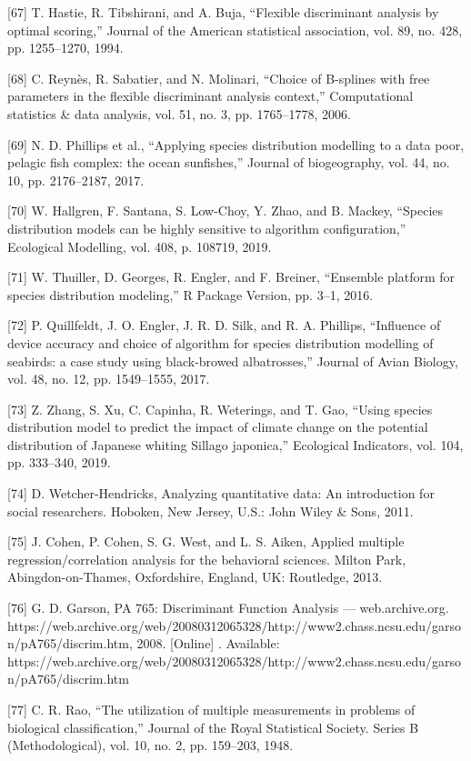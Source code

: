\documentclass[sn-mathphys-num]{sn-jnl}%
\begin{document}
[67] T. Hastie, R. Tibshirani, and A. Buja, “Flexible discriminant analysis by optimal scoring,” Journal of the American statistical association, vol. 89, no. 428, pp. 1255–1270, 1994.

[68] C. Reynès, R. Sabatier, and N. Molinari, “Choice of B-splines with free parameters in the flexible discriminant analysis context,” Computational statistics & data analysis, vol. 51, no. 3, pp. 1765–1778, 2006.

[69] N. D. Phillips et al., “Applying species distribution modelling to a data poor, pelagic fish complex: the ocean sunfishes,” Journal of biogeography, vol. 44, no. 10, pp. 2176–2187, 2017.

[70] W. Hallgren, F. Santana, S. Low-Choy, Y. Zhao, and B. Mackey, “Species distribution models can be highly sensitive to algorithm configuration,” Ecological Modelling, vol. 408, p. 108719, 2019.

[71] W. Thuiller, D. Georges, R. Engler, and F. Breiner, “Ensemble platform for species distribution modeling,” R Package Version, pp. 3–1, 2016.

[72] P. Quillfeldt, J. O. Engler, J. R. D. Silk, and R. A. Phillips, “Influence of device accuracy and choice of algorithm for species distribution modelling of seabirds: a case study using black-browed albatrosses,” Journal of Avian Biology, vol. 48, no. 12, pp. 1549–1555, 2017.

[73] Z. Zhang, S. Xu, C. Capinha, R. Weterings, and T. Gao, “Using species distribution model to predict the impact of climate change on the potential distribution of Japanese whiting Sillago japonica,” Ecological Indicators, vol. 104, pp. 333–340, 2019.

[74] D. Wetcher-Hendricks, Analyzing quantitative data: An introduction for social researchers. Hoboken, New Jersey, U.S.: John Wiley & Sons, 2011.

[75] J. Cohen, P. Cohen, S. G. West, and L. S. Aiken, Applied multiple regression/correlation analysis for the behavioral sciences. Milton Park, Abingdon-on-Thames, Oxfordshire, England, UK: Routledge, 2013.

[76] G. D. Garson, PA 765: Discriminant Function Analysis — web.archive.org. https://web.archive.org/web/20080312065328/http://www2.chass.ncsu.edu/garson/pA765/discrim.htm, 2008. [Online] . Available: https://web.archive.org/web/20080312065328/http://www2.chass.ncsu.edu/garson/pA765/discrim.htm

[77] C. R. Rao, “The utilization of multiple measurements in problems of biological classification,” Journal of the Royal Statistical Society. Series B (Methodological), vol. 10, no. 2, pp. 159–203, 1948.
\end{document}
